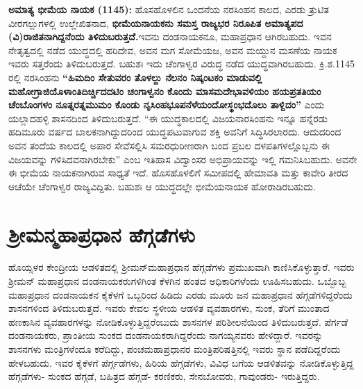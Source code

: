 \textbf{ಅಮಾತ್ಯ ಭೀಮೆಯ ನಾಯಕ (1145):} ಹೊಸಹೊಳಲಿನ ಒಂದನೆಯ ನರಸಿಂಹನ ಕಾಲದ, ಎರಡು ತ್ರುಟಿತ ವೀರಗಲ್ಲುಗಳಲ್ಲಿ ಉಲ್ಲೇಖಿತನಾದ,\textbf{ ಭೀಮೆಯನಾಯಕನು ಸಮಸ್ತ ರಾಜ್ಯಭರ ನಿರೂಪಿತ ಅಮಾತ್ಯಪದ (ವಿ)ರಾಜಿತನಾಗಿದ್ದನೆಂದು ತಿಳಿದುಬರುತ್ತದೆ.}ಇವನು ದಂಡನಾಯಕನೂ, ಮಹಾಪ್ರಧಾನ ಆಗಿರಬಹುದು. ಇವನ ನೇತೃತ್ವದಲ್ಲಿ ನಡೆದ ಯುದ್ಧದಲ್ಲಿ ಹರಿದೇವ, ಅವನ ಮಗ ಸೋಮೆಯಜ, ಅವನ ಮಯ್ದುನ ಮಸಣೆಯ ನಾಯಕ ಇವರು ಸತ್ತರೆಂದು ತಿಳಿದುಬರುತ್ತದೆ. ಬಹುಶಃ ಇದು ಚೆಂಗಾಳ್ವರ ವಿರುದ್ಧ ನಡೆದ ಯುದ್ಧವಾಗಿರಬಹುದು. ಕ್ರಿ.ಶ.1145 ರಲ್ಲಿ ನರಸಿಂಹನು \textbf{“ಹಿಮದಿಂ ಸೇತುವರಂ ತೊಳಲ್ದು ನೆಲನಂ ನಿಷ್ಕಂಟಕಂ ಮಾಡುವಲ್ಲಿ ಮಹೋಗ್ರಾಜಿಯೊಳಾಂತಿದಿರ್ಚ್ಚಿದದಟಿಂ ಚಂಗಾಳ್ವನಂ ಕೊಂದು ಮಾಸಮದೇಭಾವಳಿಯಂ ಹಯಪ್ರತತಿಯಂ ಚೆಂಬೊಂಗಳಂ ನೂತ್ನರತ್ನಮುಮಂ ಕೊಂಡು ನೃಸಿಂಹಭೂಪನೆಳೆಯಂದೋಸ್ಥಂಭದೊಲು ತಾಳ್ದಿದಂ”} ಎಂದು ಯಲ್ಲಾದಹಳ್ಳಿ ಶಾಸನದಿಂದ ತಿಳಿದುಬರುತ್ತದೆ. “ಈ ಯುದ್ಧಕಾಲದಲ್ಲಿ ವಿಜಯನಾರಸಿಂಹನು ಇನ್ನೂ ಹನ್ನೆರಡು ಹದಿಮೂರು ವರ್ಷದ ಬಾಲಕನಾಗಿದ್ದುದರಿಂದ ಯುದ್ಧಪಟುವಾಗುವ ಶಕ್ತಿ ಅವನಿಗೆ ಸಿದ್ಧಿಸಿರಲಾರದು. ಆದುದರಿಂದ ಅವನ ತಂದೆಯ ಕಾಲದಲ್ಲಿ ಅಪಾರ ಸೇವೆಸಲ್ಲಿಸಿ ಸಮರಧುರೀಣರಾಗಿ ಬಂದ ಪ್ರಬಲ ದಳಪತಿಗಳಲ್ಲೊಬ್ಬನು ಈ ವಿಜಯವನ್ನು ಗಳಿಸಿದವನಾಗಿರಬೇಕು” ಎಂಬ ಇತಿಹಾಸ ವಿದ್ವಾಂಸರ ಅಭಿಪ್ರಾಯವನ್ನು ಇಲ್ಲಿ ಗಮನಿಸಿಬಹುದು. ಅವನೇ ಈ ಭೀಮೆಯ ನಾಯಕನಾಗಿರುವ ಸಾಧ್ಯತೆ ಇದೆ. ಹೊಸಹೊಳಲಿಗೆ ಸಮೀಪದಲ್ಲಿ ಹೇಮಾವತಿ ಮತ್ತು ಕಾವೇರಿ ತೀರದ ಆಚೆಯೇ ಚೆಂಗಾಳ್ವರ ರಾಜ್ಯವಿದ್ದಿತು. ಬಹುಶಃ ಆ ಯುದ್ಧದಲ್ಲೇ ಭೀಮೆಯನಾಯಕ ಹೋರಾಡಿರಬಹುದು.


\section{ಶ‍್ರೀಮನ್ಮಹಾಪ್ರಧಾನ ಹೆಗ್ಗಡೆಗಳು}

ಹೊಯ್ಸಳರ ಕೇಂದ್ರೀಯ ಆಡಳಿತದಲ್ಲಿ ಶ‍್ರೀಮನ್​ಮಹಾಪ್ರಧಾನ ಹೆಗ್ಗಡೆಗಳು ಪ್ರಮುಖವಾಗಿ ಕಾಣಿಸಿಕೊಳ್ಳುತ್ತಾರೆ. ಇವರು ಶ‍್ರೀಮನ್​ ಮಹಾಪ್ರಧಾನ ದಂಡನಾಯಕರುಗಳಿಗಿಂತ ಕೆಳಗಿನ ಹಂತದ ಅಧಿಕಾರಿಗಳೆಂದು ಊಹಿಸಬಹುದು. ಒಬ್ಬೊಬ್ಬ ಮಹಾಪ್ರಧಾನ ದಂಡನಾಯಕನ ಕೈಕೆಳಗೆ ಒಬ್ಬರಿಂದ ಹಿಡಿದು ಎರಡು ಮೂರು ಜನ ಮಹಾಪ್ರಧಾನ ಹೆಗ್ಗಡೆಗಳಿದ್ದರೆಂದು ಶಾಸನಗಳಿಂದ ತಿಳಿದುಬರುತ್ತದೆ. ಇವರು ಕೇವಲ ಸ್ಥಳೀಯ ಆಡಳಿತ ವ್ಯವಹಾರಗಳು, ಸುಂಕ, ತೆರಿಗೆ ಮುಂತಾದ ಹಣಕಾಸಿನ ವ್ಯವಹಾರಗಳನ್ನು ನೋಡಿಕೊಳ್ಳುತ್ತಿದ್ದರೆಂಬುದು ಶಾಸನಗಳ ಪರಿಶೀಲನೆಯಿಂದ ತಿಳಿದುಬರುತ್ತದೆ. ಪೆರ್ಗಡೆ ದಂಡನಾಯಕರು, ಪ್ರಾಂತೀಯ ಸುಂಕದ ದಂಡನಾಯಕರಾಗಿದ್ದರೆಂದು ನಾಗಯ್ಯನವರು ಹೇಳಿದ್ದಾರೆ. ಇವರನ್ನು ಶಾಸನಗಳು ಮಂತ್ರಿಗಳೆಂದೂ ಕರೆದಿದ್ದು, ಪಂಚಮಹಾಪ್ರಧಾನರ ಮಂತ್ರಿಪರಿಷತ್ತಿನಲ್ಲಿ ಇವರು ಸ್ಥಾನ ಪಡೆದಿದ್ದರೆಂದು ಹೇಳಬಹುದು. ಇವರ ಕೈಕೆಳಗೆ ಪೆರ್ಗ್ಗಡೆಗಳು, ಹಿರಿಯ ಹೆಗ್ಗಡೆಗಳು, ವಿವಿಧ ಬಗೆಯ ಆಡಳಿತವನ್ನು ನೋಡಿಕೊಳ್ಳುತ್ತಿದ್ದ ಹೆಗ್ಗಡೆಗಳು- ಸುಂಕದ ಹೆಗ್ಗಡೆ, ಬಹಿತ್ರದ ಹೆಗ್ಗಡೆ- ಕರಣಿಕರು, ಸೇನಬೋವರು, ಗಾವುಂಡರು- ಇರುತ್ತಿದ್ದರು.

